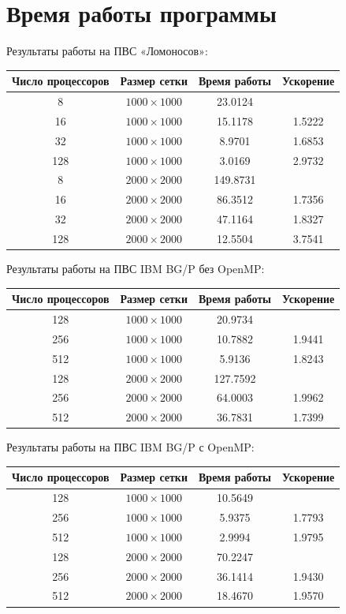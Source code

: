 \documentclass[12pt]{article}
\theoremstyle{rusdef}
\begin{document}
	\section{Время работы программы}
	Результаты работы на ПВС «Ломоносов»:
	
	\begin{tabular}{ c c c c }
		\hline
		Число процессоров & Размер сетки & Время работы & Ускорение \\
		\hline
		8 & $1000\times1000$ & 23.0124 & \\
		16 & $1000\times1000$ & 15.1178 & 1.5222 \\
		32 & $1000\times1000$ & 8.9701 & 1.6853 \\
		128 & $1000\times1000$ & 3.0169 & 2.9732 \\
		8 & $2000\times2000$ & 149.8731 & \\
		16 & $2000\times2000$ & 86.3512 & 1.7356 \\
		32 & $2000\times2000$ & 47.1164 & 1.8327 \\
		128 & $2000\times2000$ & 12.5504 & 3.7541 \\
		\hline
	\end{tabular}\newline\newline
	
	Результаты работы на ПВС IBM BG/P без OpenMP:
	
	\begin{tabular}{ c c c c }
		\hline
		Число процессоров & Размер сетки & Время работы & Ускорение \\
		\hline
		128 & $1000\times1000$ & 20.9734 & \\
		256 & $1000\times1000$ & 10.7882 & 1.9441 \\
		512 & $1000\times1000$ & 5.9136 & 1.8243 \\
		128 & $2000\times2000$ & 127.7592 & \\
		256 & $2000\times2000$ & 64.0003 & 1.9962 \\
		512 & $2000\times2000$ & 36.7831 & 1.7399 \\
		\hline
	\end{tabular}\newline\newline
	
	Результаты работы на ПВС IBM BG/P с OpenMP:

	\begin{tabular}{ c c c c }
		\hline
		Число процессоров & Размер сетки & Время работы & Ускорение \\
		\hline
		128 & $1000\times1000$ & 10.5649 & \\
		256 & $1000\times1000$ & 5.9375 & 1.7793 \\
		512 & $1000\times1000$ & 2.9994 & 1.9795 \\
		128 & $2000\times2000$ & 70.2247 & \\
		256 & $2000\times2000$ & 36.1414 & 1.9430 \\
		512 & $2000\times2000$ & 18.4670 & 1.9570 \\
		\hline
	\end{tabular}\newline\newline
\end{document}
